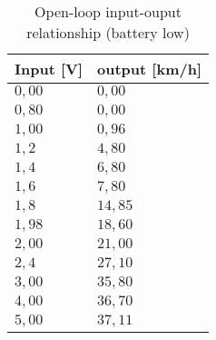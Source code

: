\begin{table}[htbp]
\begin{tabularx}{\textwidth}{ |Y|Y| }
\hline
Input [V] & output [km/h] \\
\hline \hline
$0,00$ & $0,00$ \\
\hline
$0,80$ & $0,00$  \\
\hline
$1,00$ & $0,96$  \\
\hline
$1,2$ & $4,80$  \\
\hline
$1,4$ & $6,80$  \\
\hline
$1,6$ & $7,80$  \\
\hline
$1,8$ & $14,85$  \\
\hline
$1,98$ & $18,60$  \\
\hline
$2,00$ & $21,00$  \\
\hline
$2,4$ & $27,10$  \\
\hline
$3,00$ & $35,80$  \\
\hline
$4,00$ & $36,70$ \\
\hline
$5,00$ & $37,11$ \\
\hline
\end{tabularx}
\caption{Open-loop input-ouput relationship (battery low)}
\end{table}